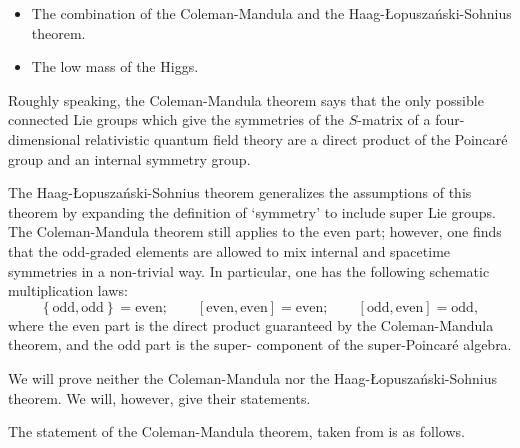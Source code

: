 \documentclass[a4paper,10pt]{scrreprt}
\theoremstyle{definition}
\theoremstyle{plain}
\theoremstyle{remark}
\begin{document}
\begin{itemize}
  \item The combination of the Coleman-Mandula and the Haag-{\L}opusza{\'n}ski-Sohnius theorem.

  \item The low mass of the Higgs.
\end{itemize}

Roughly speaking, the Coleman-Mandula theorem says that the only possible connected Lie groups which give the symmetries of the $S$-matrix of a four-dimensional relativistic quantum field theory are a direct product of the Poincar{\'e} group and an internal symmetry group. 

The Haag-{\L}opusza{\'n}ski-Sohnius theorem generalizes the assumptions of this theorem by expanding the definition of `symmetry' to include super Lie groups. The Coleman-Mandula theorem still applies to the even part; however, one finds that the odd-graded elements are allowed to mix internal and spacetime symmetries in a non-trivial way. In particular, one has the following schematic multiplication laws:
\begin{equation*}
  \left\{ \text{odd}, \text{odd} \right\} = \text{even};\qquad \left[ \text{even}, \text{even} \right] = \text{even};\qquad \left[ \text{odd}, \text{even} \right] = \text{odd},
\end{equation*}
where the even part is the direct product guaranteed by the Coleman-Mandula theorem, and the odd part is the super- component of the super-Poincar{\'e} algebra.

We will prove neither the Coleman-Mandula nor the Haag-{\L}opusza{\'n}ski-Sohnius theorem. We will, however, give their statements.

The statement of the Coleman-Mandula theorem, taken from \cite{muller-kirsen-wiedmann-intro-susy} is as follows.
\end{document}
